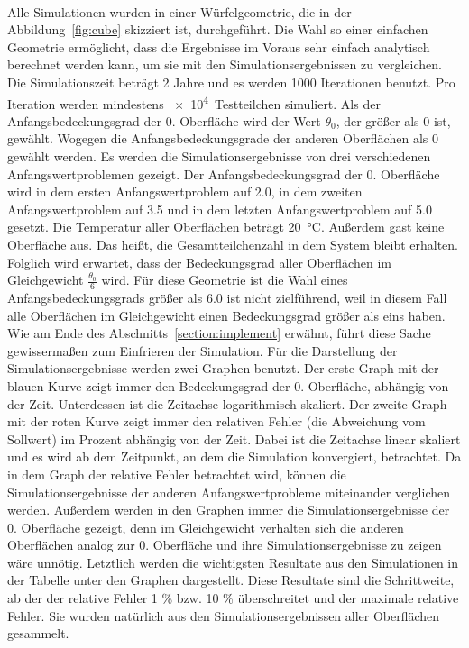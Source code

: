 \documentclass{listhesis}
\begin{document}
\paragraph{}
Alle Simulationen wurden in einer Würfelgeometrie, die in der Abbildung~\ref{fig:cube} skizziert ist, durchgeführt. Die Wahl so einer einfachen Geometrie ermöglicht, dass die Ergebnisse im Voraus sehr einfach analytisch berechnet werden kann, um sie mit den Simulationsergebnissen zu vergleichen. Die Simulationszeit beträgt 2 Jahre und es werden 1000 Iterationen benutzt. Pro Iteration werden mindestens \SI{e4}{Testteilchen} simuliert. Als der Anfangsbedeckungsgrad der 0. Oberfläche wird der Wert $\theta_0$, der größer als 0 ist, gewählt. Wogegen die Anfangsbedeckungsgrade der anderen Oberflächen als 0 gewählt werden. Es werden die Simulationsergebnisse von drei verschiedenen Anfangswertproblemen gezeigt. Der Anfangsbedeckungsgrad der 0. Oberfläche wird in dem ersten Anfangswertproblem auf 2.0, in dem zweiten Anfangswertproblem auf 3.5 und in dem letzten Anfangswertproblem auf 5.0 gesetzt. Die Temperatur aller Oberflächen beträgt \SI{20}{\celsius}. Außerdem gast keine Oberfläche aus. Das heißt, die Gesamtteilchenzahl in dem System bleibt erhalten. Folglich wird erwartet, dass der Bedeckungsgrad aller Oberflächen im Gleichgewicht $\frac{\theta_0}{6}$ wird. Für diese Geometrie ist die Wahl eines Anfangsbedeckungsgrads größer als 6.0 ist nicht zielführend, weil in diesem Fall alle Oberflächen im Gleichgewicht einen Bedeckungsgrad größer als eins haben. Wie am Ende des Abschnitts~\ref{section:implement} erwähnt, führt diese Sache gewissermaßen zum Einfrieren der Simulation. Für die Darstellung der Simulationsergebnisse werden zwei Graphen benutzt. Der erste Graph mit der blauen Kurve zeigt immer den Bedeckungsgrad der 0. Oberfläche, abhängig von der Zeit. Unterdessen ist die Zeitachse logarithmisch skaliert. Der zweite Graph mit der roten Kurve zeigt immer den relativen Fehler (die Abweichung vom Sollwert) im Prozent abhängig von der Zeit. Dabei ist die Zeitachse linear skaliert und es wird ab dem Zeitpunkt, an dem die Simulation konvergiert, betrachtet. Da in dem Graph der relative Fehler betrachtet wird, können die Simulationsergebnisse der anderen Anfangswertprobleme miteinander verglichen werden. Außerdem werden in den Graphen immer die Simulationsergebnisse der 0. Oberfläche gezeigt, denn im Gleichgewicht verhalten sich die anderen Oberflächen analog zur 0. Oberfläche und ihre Simulationsergebnisse zu zeigen wäre unnötig. Letztlich werden die wichtigsten Resultate aus den Simulationen in der Tabelle unter den Graphen dargestellt. Diese Resultate sind die Schrittweite, ab der der relative Fehler 1 \% bzw. 10 \% überschreitet und der maximale relative Fehler. Sie wurden natürlich aus den Simulationsergebnissen aller Oberflächen gesammelt.
\end{document}

